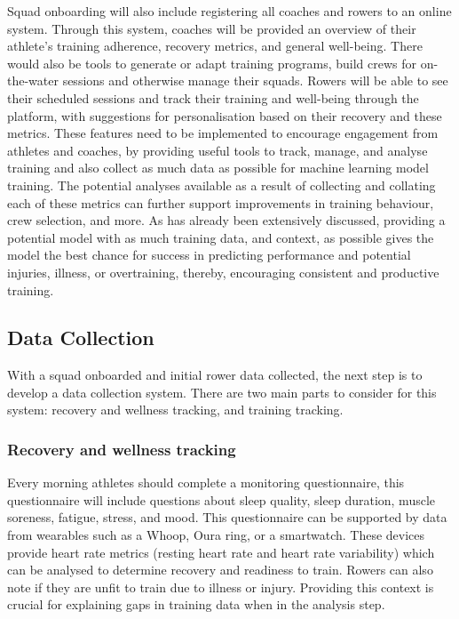 Squad onboarding will also include registering all coaches and rowers to an online system. Through this system, coaches will be provided an overview of their athlete's training adherence, recovery metrics, and general well-being. There would also be tools to generate or adapt training programs, build crews for on-the-water sessions and otherwise manage their squads. Rowers will be able to see their scheduled sessions and track their training and well-being through the platform, with suggestions for personalisation based on their recovery and these metrics. These features need to be implemented to encourage engagement from athletes and coaches, by providing useful tools to track, manage, and analyse training and also collect as much data as possible for machine learning model training. The potential analyses available as a result of collecting and collating each of these metrics can further support improvements in training behaviour, crew selection, and more. As has already been extensively discussed, providing a potential model with as much training data, and context, as possible gives the model the best chance for success in predicting performance and potential injuries, illness, or overtraining, thereby, encouraging consistent and productive training. 

\subsection{\label{sub:ideal-data-collection}Data Collection}
With a squad onboarded and initial rower data collected, the next step is to develop a data collection system. There are two main parts to consider for this system: recovery and wellness tracking, and training tracking.

\subsubsection{Recovery and wellness tracking}
Every morning athletes should complete a monitoring questionnaire, this questionnaire will include questions about sleep quality, sleep duration, muscle soreness, fatigue, stress, and mood. This questionnaire can be supported by data from wearables such as a Whoop, Oura ring, or a smartwatch. These devices provide heart rate metrics (resting heart rate and heart rate variability) which can be analysed to determine recovery and readiness to train. Rowers can also note if they are unfit to train due to illness or injury. Providing this context is crucial for explaining gaps in training data when in the analysis step.

